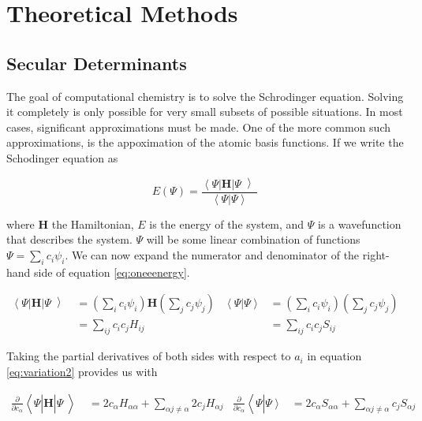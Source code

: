 \chapter{Theoretical Methods} \label{theoreticalMethods}

\section{Secular Determinants}\label{secular}

The goal of computational chemistry is to solve the Schrodinger equation.
Solving it completely is only possible for very small subsets of possible situations.
In most cases, significant approximations must be made.
One of the more common such approximations, is the appoximation of the atomic basis functions.
If we write the Schodinger equation as

\begin{equation} \label{eq:oneeenergy}
E(\Psi) = \frac{\left<\right.\Psi\left|\right.\bm{H}\left.\right|\Psi\left>\right.}{\left<\right.\Psi\left.\right|\left.\Psi\left.\right.\right>}
\end{equation}

where $\mathbf{H}$ the Hamiltonian, $E$ is the energy of the
system, and $\Psi$ is a wavefunction that describes the system.
$\Psi$ will be some linear combination of functions $\Psi=\sum_{i}c_i\psi_i$.
We can now expand the numerator and denominator of the right-hand side of equation \ref{eq:oneeenergy}.

\begin{align}
  \label{eq:variation1}
  \left<\right.\Psi\left|\right.\bm{H}\left.\right|\Psi\left>\right.&=
								      \left( \sum_{i} c_i \psi_i \right) \mathbf{H} \left( \sum_j c_j \psi_j \right) &
																		       \left<\right.\Psi\left.\right|\left.\Psi\left.\right.\right>&=
																										     \left( \sum_{i} c_i \psi_i \right) \left( \sum_j c_j \psi_j \right)  \\
								    &= \sum_{ij} c_{i}c_j H_{ij} & &= \sum_{ij} c_{i}c_j S_{ij} 
  \label{eq:variation2}
\end{align}

Taking the partial derivatives of both sides with respect to $a_i$ in
equation \ref{eq:variation2} provides us with

\begin{align}
  \label{eq:variationexpansion}
  \frac{\partial}{\partial c_{\alpha}}
  \left<\right.\Psi\left|\right.\bm{H}\left.\right|\Psi\left>\right.&=
								      2c_\alpha H_{\alpha \alpha} + \sum_{\alpha j \neq \alpha} 2c_j H_{\alpha j} &
																		    \frac{\partial}{\partial c_{\alpha}}
																		    \left<\right.\Psi\left.\right|\left.\Psi\left.\right.\right>&=
																										  2 c_\alpha S_{\alpha\alpha} + \sum_{\alpha j \neq \alpha} c_j S_{\alpha j}
\end{align}

